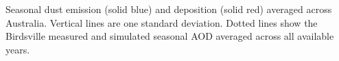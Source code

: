 \label{fig:seasonaldust}
Seasonal dust emission (solid blue) and deposition (solid red) averaged across Australia.
Vertical lines are one standard deviation.
Dotted lines show the Birdsville measured and simulated seasonal AOD averaged across all available years.

